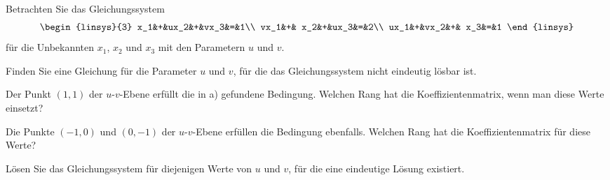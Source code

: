 Betrachten Sie das Gleichungssystem \[
\begin{linsys}{3}
 x_1&+&ux_2&+&vx_3&=&1\\
vx_1&+& x_2&+&ux_3&=&2\\
ux_1&+&vx_2&+& x_3&=&1
\end{linsys}
\]
für die Unbekannten $x_1$, $x_2$ und $x_3$ mit den Parametern $u$ und $v$.
\begin{teilaufgaben}
\item
Finden Sie eine Gleichung für die Parameter $u$ und $v$, für die das
Gleichungssystem nicht eindeutig lösbar ist.
\item
Der Punkt $(1,1)$ der $u$-$v$-Ebene erfüllt die in a) gefundene Bedingung. 
Welchen Rang hat die Koeffizientenmatrix, wenn man diese Werte einsetzt?
\item
Die Punkte $(-1,0)$ und $(0,-1)$ der $u$-$v$-Ebene erfüllen die Bedingung
ebenfalls.
Welchen Rang hat die Koeffizientenmatrix für diese Werte?
\item
Lösen Sie das Gleichungssystem für diejenigen Werte von $u$ und $v$,
für die eine eindeutige Lösung existiert.
\end{teilaufgaben}

